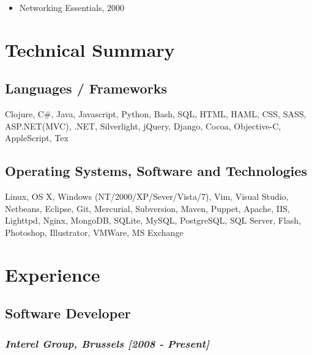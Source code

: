 \documentclass{article}
\begin{document}
\begin{itemize}
\item Networking Essentials, 2000
\end{itemize}
\section*{Technical Summary}
\label{sec-2}

\subsection*{Languages / Frameworks}
\label{sec-2.1}

Clojure, C\#, Java, Javascript, Python, Bash, SQL, HTML, HAML, CSS, SASS, ASP.NET(MVC), .NET, Silverlight, jQuery, Django, Cocoa, Objective-C, AppleScript, Tex
\subsection*{Operating Systems, Software and Technologies}
\label{sec-2.2}

Linux, OS X, Windows (NT/2000/XP/Sever/Vista/7), Vim, Visual Studio, Netbeans, Eclipse, Git, Mercurial, Subversion, Maven, Puppet, Apache, IIS, Lighttpd, Nginx, MongoDB, SQLite, MySQL, PostgreSQL, SQL Server, Flash, Photoshop, Illustrator, VMWare, MS Exchange
\section*{Experience}
\label{sec-3}

\subsection*{Software Developer}
\label{sec-3.1}

\subsubsection*{\emph{Interel Group, Brussels  [2008 - Present]}}
\label{sec-3.1.1}
\end{document}
